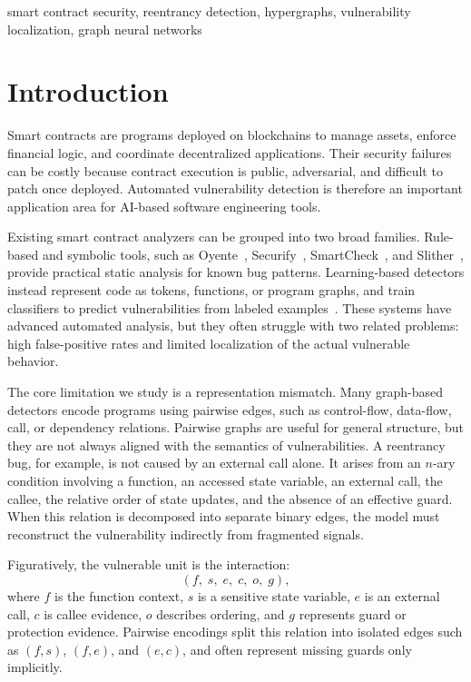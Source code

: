 \documentclass[conference]{IEEEtran}
\begin{document}
\begin{IEEEkeywords}
smart contract security, reentrancy detection, hypergraphs, vulnerability localization, graph neural networks
\end{IEEEkeywords}

\section{Introduction}

Smart contracts are programs deployed on blockchains to manage assets, enforce financial logic, and coordinate decentralized applications. Their security failures can be costly because contract execution is public, adversarial, and difficult to patch once deployed. Automated vulnerability detection is therefore an important application area for AI-based software engineering tools.

Existing smart contract analyzers can be grouped into two broad families. Rule-based and symbolic tools, such as Oyente~\cite{luu2016oyente}, Securify~\cite{tsankov2018securify}, SmartCheck~\cite{tikhomirov2018smartcheck}, and Slither~\cite{feist2019slither}, provide practical static analysis for known bug patterns. Learning-based detectors instead represent code as tokens, functions, or program graphs, and train classifiers to predict vulnerabilities from labeled examples~\cite{zhuang2020gnn}. These systems have advanced automated analysis, but they often struggle with two related problems: high false-positive rates and limited localization of the actual vulnerable behavior.

The core limitation we study is a representation mismatch. Many graph-based detectors encode programs using pairwise edges, such as control-flow, data-flow, call, or dependency relations. Pairwise graphs are useful for general structure, but they are not always aligned with the semantics of vulnerabilities. A reentrancy bug, for example, is not caused by an external call alone. It arises from an $n$-ary condition involving a function, an accessed state variable, an external call, the callee, the relative order of state updates, and the absence of an effective guard. When this relation is decomposed into separate binary edges, the model must reconstruct the vulnerability indirectly from fragmented signals.

Figuratively, the vulnerable unit is the interaction:
\begin{equation}
(f,\; s,\; e,\; c,\; o,\; g),
\end{equation}
where $f$ is the function context, $s$ is a sensitive state variable, $e$ is an external call, $c$ is callee evidence, $o$ describes ordering, and $g$ represents guard or protection evidence. Pairwise encodings split this relation into isolated edges such as $(f,s)$, $(f,e)$, and $(e,c)$, and often represent missing guards only implicitly.
\end{document}
